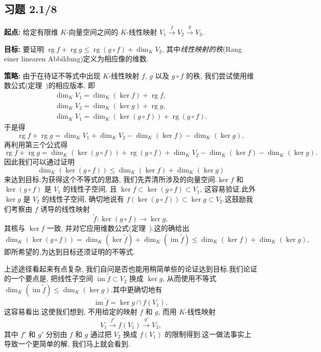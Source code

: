 \subsection*{习题 2.1/8}

\noindent\textbf{起点:} 给定有限维 $K$-向量空间之间的 $K$-线性映射 $V_1 \xrightarrow{f} V_2 \xrightarrow{g} V_3$.

\noindent\textbf{目标:} 要证明 $\operatorname{rg} f + \operatorname{rg} g \leq \operatorname{rg}(g \circ f) + \dim_K V_2$, 其中\emph{线性映射的秩}(\textup{Rang einer linearen Abbildung})定义为相应像的维数.

\noindent\textbf{策略:} 由于在待证不等式中出现 $K$-线性映射 $f$, $g$ 以及 $g \circ f$ 的秩, 我们尝试使用维数公式(定理~)的相应版本, 即
\[
\begin{array}{l}
\dim_K V_1 = \dim_K(\ker f) + \operatorname{rg} f,\\
\dim_K V_2 = \dim_K(\ker g) + \operatorname{rg} g,\\
\dim_K V_1 = \dim_K(\ker(g \circ f)) + \operatorname{rg}(g \circ f).
\end{array}
\]
于是得
\[
\operatorname{rg} f + \operatorname{rg} g = \dim_K V_1 + \dim_K V_2 - \dim_K(\ker f) - \dim_K(\ker g),
\]
再利用第三个公式得
\[
\operatorname{rg} f + \operatorname{rg} g = \dim_K(\ker(g \circ f)) + \operatorname{rg}(g \circ f) + \dim_K V_2 - \dim_K(\ker f) - \dim_K(\ker g).
\]
因此我们可以通过证明
\[
\dim_K(\ker(g \circ f)) \leq \dim_K(\ker f) + \dim_K(\ker g)
\]
来达到目标.为获得这个不等式的思路, 我们先弄清所涉及的向量空间.$\ker f$ 和 $\ker(g \circ f)$ 是 $V_1$ 的线性子空间, 且 $\ker f \subset \ker(g \circ f) \subset V_1$, 这容易验证.此外 $\ker g$ 是 $V_2$ 的线性子空间, 确切地说有 $f(\ker(g \circ f)) \subset \ker g \subset V_2$.这鼓励我们考察由 $f$ 诱导的线性映射
\[
\tilde{f} \colon \ker(g \circ f) \longrightarrow \ker g,
\]
其核与 $\ker f$ 一致, 并对它应用维数公式(定理~).这的确给出
\[
\dim_K(\ker(g \circ f)) = \dim_K(\ker \tilde{f}) + \dim_K(\operatorname{im} \tilde{f}) \leq \dim_K(\ker f) + \dim_K(\ker g),
\]
即所希望的,为达到目标还须证明的不等式.

上述途径看起来有点复杂, 我们自问是否也能用稍简单些的论证达到目标.我们论证的一个要点是, 把线性子空间 $\operatorname{im} \tilde{f} \subset V_2$ 换成 $\ker g$, 从而使用不等式 $\dim_K(\operatorname{im} \tilde{f}) \leq \dim_K(\ker g)$.其中更确切地有
\[
\operatorname{im} \tilde{f} = \ker g \cap f(V_1),
\]
这容易看出.这使我们想到, 不用给定的映射 $f$ 和 $g$, 而用 $K$-线性映射
\[
V_1 \xrightarrow{f'} f(V_1) \xrightarrow{g'} V_3,
\]
其中 $f'$ 和 $g'$ 分别由 $f$ 和 $g$ 通过把 $V_2$ 换成 $f(V_1)$ 的限制得到.这一做法事实上导致一个更简单的解, 我们马上就会看到.

